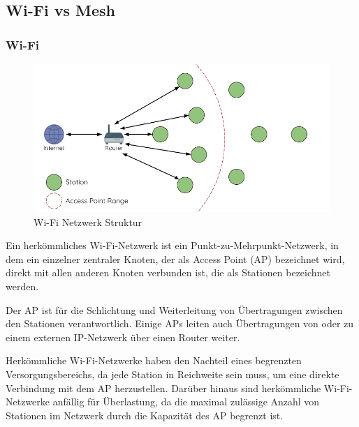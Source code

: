 \subsection{Wi-Fi vs Mesh}

\subsubsection{Wi-Fi}

\begin{figure}[H] \begin{center}
    \includegraphics[scale=0.5]{diagrams/wifi-network-architecture.png}
    \caption{Wi-Fi Netzwerk Struktur \cite{esp-mesh}}
    \end{center}    
\end{figure}

Ein herkömmliches Wi-Fi-Netzwerk ist ein Punkt-zu-Mehrpunkt-Netzwerk, in dem ein einzelner zentraler Knoten, der als Access Point (AP) bezeichnet wird, direkt mit allen anderen Knoten verbunden ist, die als Stationen bezeichnet werden.

Der AP ist für die Schlichtung und Weiterleitung von Übertragungen zwischen den Stationen verantwortlich. Einige APs leiten auch Übertragungen von oder zu einem externen IP-Netzwerk über einen Router weiter.

Herkömmliche Wi-Fi-Netzwerke haben den Nachteil eines begrenzten Versorgungsbereichs, da jede Station in Reichweite sein muss, um eine direkte Verbindung mit dem AP herzustellen. Darüber hinaus sind herkömmliche Wi-Fi-Netzwerke anfällig für Überlastung, da die maximal zulässige Anzahl von Stationen im Netzwerk durch die Kapazität des AP begrenzt ist.

